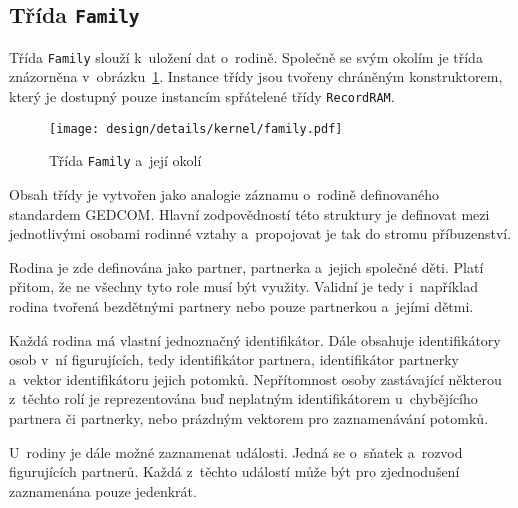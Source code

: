 		\subsection*{Třída \texttt{Family}}
		Třída \texttt{Family} slouží k~uložení dat o~rodině. Společně se svým okolím je třída znázorněna v~obrázku~\ref{fig:designDetailFamily}. Instance třídy jsou tvořeny chráněným konstruktorem, který je dostupný pouze instancím spřátelené třídy \texttt{RecordRAM}.\par
		\begin{figure}[h]
			\centering
			\texttt{[image: design/details/kernel/family.pdf]}
			\caption{Třída \texttt{Family} a~její okolí}
			\label{fig:designDetailFamily}
		\end{figure}
		Obsah třídy je vytvořen jako analogie záznamu o~rodině definovaného standardem GEDCOM. Hlavní zodpovědností této struktury je definovat mezi jednotlivými osobami rodinné vztahy a~propojovat je tak do stromu příbuzenství.\par
		Rodina je zde definována jako partner, partnerka a~jejich společné děti. Platí přitom, že ne všechny tyto role musí být využity. Validní je tedy i~například rodina tvořená bezdětnými partnery nebo pouze partnerkou a~jejími dětmi. \par
		Každá rodina má vlastní jednoznačný identifikátor. Dále obsahuje identifikátory osob v~ní figurujících, tedy identifikátor partnera, identifikátor partnerky a~vektor identifikátoru jejich potomků. Nepřítomnost osoby zastávající některou z~těchto rolí je reprezentována buď neplatným identifikátorem u~chybějícího partnera či partnerky, nebo prázdným vektorem pro zaznamenávání potomků.\par
		U~rodiny je dále možné zaznamenat události. Jedná se o~sňatek a~rozvod figurujících partnerů. Každá z~těchto událostí může být pro zjednodušení zaznamenána pouze jedenkrát. \par
		
